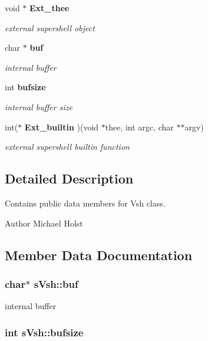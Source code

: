 \begin{DoxyCompactItemize}
void $\ast$ {\bf Ext\_\-thee}
\begin{DoxyCompactList}\small\item\em external supershell object \item\end{DoxyCompactList}\item 
char $\ast$ {\bf buf}
\begin{DoxyCompactList}\small\item\em internal buffer \item\end{DoxyCompactList}\item 
int {\bf bufsize}
\begin{DoxyCompactList}\small\item\em internal buffer size \item\end{DoxyCompactList}\item 
int($\ast$ {\bf Ext\_\-builtin} )(void $\ast$thee, int argc, char $\ast$$\ast$argv)
\begin{DoxyCompactList}\small\item\em external supershell builtin function \item\end{DoxyCompactList}\end{DoxyCompactItemize}


\subsection{Detailed Description}
Contains public data members for Vsh class. \begin{DoxyAuthor}{Author}
Michael Holst 
\end{DoxyAuthor}


\subsection{Member Data Documentation}
\subsubsection[{buf}]{\setlength{\rightskip}{0pt plus 5cm}char$\ast$ {\bf sVsh::buf}}\label{a00007_a54d6581a859ce3e568994a2acb34eeca}


internal buffer 

\subsubsection[{bufsize}]{\setlength{\rightskip}{0pt plus 5cm}int {\bf sVsh::bufsize}}\label{a00007_a3178ea2c169d30c7de2db923c6fc1472}


